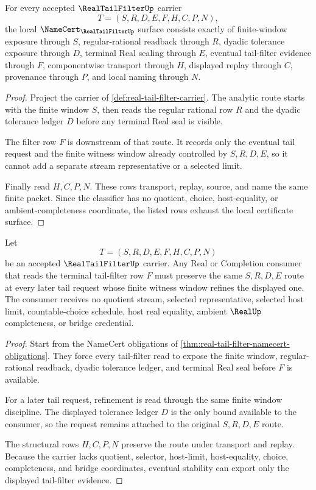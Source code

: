 \begin{theorem}
\label{thm:real-tail-filter-namecert-obligations}
For every accepted $\RealTailFilterUp$ carrier
$$
T=(S,R,D,E,F,H,C,P,N),
$$
the local $\NameCert_{\RealTailFilterUp}$ surface consists exactly of finite-window exposure through $S$, regular-rational readback through $R$, dyadic tolerance exposure through $D$, terminal Real sealing through $E$, eventual tail-filter evidence through $F$, componentwise transport through $H$, displayed replay through $C$, provenance through $P$, and local naming through $N$.
\end{theorem}
\begin{proof}
Project the carrier of \autoref{def:real-tail-filter-carrier}. The analytic route starts with the finite window $S$, then reads the regular rational row $R$ and the dyadic tolerance ledger $D$ before any terminal Real seal is visible.

The filter row $F$ is downstream of that route. It records only the eventual tail request and the finite witness window already controlled by $S,R,D,E$, so it cannot add a separate stream representative or a selected limit.

Finally read $H,C,P,N$. These rows transport, replay, source, and name the same finite packet. Since the classifier has no quotient, choice, host-equality, or ambient-completeness coordinate, the listed rows exhaust the local certificate surface.
\end{proof}

\begin{theorem}
\label{thm:real-tail-filter-eventual-stability}
Let
$$
T=(S,R,D,E,F,H,C,P,N)
$$
be an accepted $\RealTailFilterUp$ carrier. Any Real or Completion consumer that reads the terminal tail-filter row $F$ must preserve the same $S,R,D,E$ route at every later tail request whose finite witness window refines the displayed one. The consumer receives no quotient stream, selected representative, selected host limit, countable-choice schedule, host real equality, ambient $\RealUp$ completeness, or bridge credential.
\end{theorem}
\begin{proof}
Start from the NameCert obligations of \autoref{thm:real-tail-filter-namecert-obligations}. They force every tail-filter read to expose the finite window, regular-rational readback, dyadic tolerance ledger, and terminal Real seal before $F$ is available.

For a later tail request, refinement is read through the same finite window discipline. The displayed tolerance ledger $D$ is the only bound available to the consumer, so the request remains attached to the original $S,R,D,E$ route.

The structural rows $H,C,P,N$ preserve the route under transport and replay. Because the carrier lacks quotient, selector, host-limit, host-equality, choice, completeness, and bridge coordinates, eventual stability can export only the displayed tail-filter evidence.
\end{proof}

